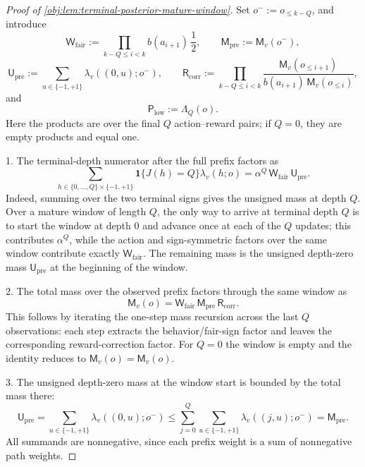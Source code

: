 \begin{proof}[Proof of \cref{obj:lem:terminal-posterior-mature-window}]
Set \(o^-:=o_{\le k-Q}\), and introduce
\[
\mathsf W_{\mathrm{fair}}
:=
\prod_{k-Q\le i<k}
 b(a_{i+1})\,\frac12,
\qquad
\mathsf M_{\mathrm{pre}}:=\mathsf M_v(o^-),
\]
\[
\mathsf U_{\mathrm{pre}}
:=
\sum_{u\in\{-1,+1\}}\lambda_v((0,u);o^-),
\qquad
\mathsf R_{\mathrm{corr}}
:=
\prod_{k-Q\le i<k}
\frac{
\mathsf M_v(o_{\le i+1})
}{
b(a_{i+1})\,\mathsf M_v(o_{\le i})
},
\]
and
\[
\mathsf P_{\mathrm{low}}:=\Lambda_Q(o).
\]
Here the products are over the final \(Q\) action--reward pairs; if \(Q=0\), they are empty products and equal one.

1. The terminal-depth numerator after the full prefix factors as
\[
\sum_{h\in\{0,\ldots,Q\}\times\{-1,+1\}}
\mathbf 1\{J(h)=Q\}\lambda_v(h;o)
=
\alpha^Q\,\mathsf W_{\mathrm{fair}}\,\mathsf U_{\mathrm{pre}} .
\]
Indeed, summing over the two terminal signs gives the unsigned mass at depth \(Q\).  Over a mature window of length \(Q\), the only way to arrive at terminal depth \(Q\) is to start the window at depth \(0\) and advance once at each of the \(Q\) updates; this contributes \(\alpha^Q\), while the action and sign-symmetric factors over the same window contribute exactly \(\mathsf W_{\mathrm{fair}}\).  The remaining mass is the unsigned depth-zero mass \(\mathsf U_{\mathrm{pre}}\) at the beginning of the window. %

2. The total mass over the observed prefix factors through the same window as
\[
\mathsf M_v(o)
=
\mathsf W_{\mathrm{fair}}\,
\mathsf M_{\mathrm{pre}}\,
\mathsf R_{\mathrm{corr}} .
\]
This follows by iterating the one-step mass recursion across the last \(Q\) observations: each step extracts the behavior/fair-sign factor and leaves the corresponding reward-correction factor.  For \(Q=0\) the window is empty and the identity reduces to \(\mathsf M_v(o)=\mathsf M_v(o)\). %

3. The unsigned depth-zero mass at the window start is bounded by the total mass there:
\[
\mathsf U_{\mathrm{pre}}
=
\sum_{u\in\{-1,+1\}}\lambda_v((0,u);o^-)
\le
\sum_{j=0}^Q\sum_{u\in\{-1,+1\}}\lambda_v((j,u);o^-)
=
\mathsf M_{\mathrm{pre}} .
\]
All summands are nonnegative, since each prefix weight is a sum of nonnegative path weights. %


\end{proof}
